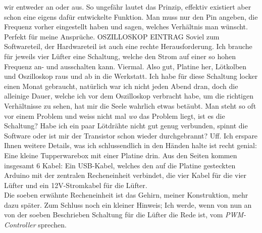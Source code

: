 \documentclass[12pt,titlepage,a4paper]{article}
\begin{document}
wir entweder an oder aus. So ungefähr lautet das Prinzip, effektiv existiert aber schon eine eigens dafür entwickelte Funktion. Man muss nur den Pin angeben, die Frequenz vorher eingestellt haben und sagen, welches Verhältnis man wünscht. Perfekt für meine Ansprüche. 
OSZILLOSKOP EINTRAG
Soviel zum Softwareteil, der Hardwareteil ist auch eine rechte Herausforderung. Ich brauche für jeweils vier Lüfter eine Schaltung, welche den Strom auf einer so hohen Frequenz an- und ausschalten kann. Viermal. Also gut, Platine her, Lötkolben und Oszilloskop raus und ab in die Werkstatt. Ich habe für diese Schaltung locker einen Monat gebraucht, natürlich war ich nicht jeden Abend dran, doch die alleinige Dauer, welche ich vor dem Oszilloskop verbracht habe, um die richtigen Verhältnisse zu sehen, hat mir die Seele wahrlich etwas betäubt. Man steht so oft vor einem Problem und weiss nicht mal \textit{wo} das Problem liegt, ist es die Schaltung? Habe ich ein paar Lötdrähte nicht gut genug verbunden, spinnt die Software oder ist mir der Transistor schon wieder durchgebrannt? Uff. Ich erspare Ihnen weitere Details, was ich schlussendlich in den Händen halte ist recht genial: Eine kleine Tupperwarebox mit einer Platine drin. Aus den Seiten kommen insgesamt 6 Kabel: Ein USB-Kabel, welches den auf die Platine gesteckten Arduino mit der zentralen Recheneinheit verbindet, die vier Kabel für die vier Lüfter und ein 12V-Stromkabel für die Lüfter. \\ Die soeben erwähnte Recheneinheit ist das Gehirn, meiner Konstruktion, mehr dazu später. Zum Schluss noch ein kleiner Hinweis; Ich werde, wenn von nun an von der soeben Beschrieben Schaltung für die Lüfter die Rede ist, vom \textit{PWM-Controller} sprechen.
\end{document}
